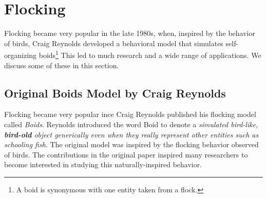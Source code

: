 





\section{Flocking}
Flocking became very popular in the late 1980s, when, inspired by the behavior of birds, Craig Reynolds developed a behavioral model that simulates self-organizing boids\footnote{A boid is synonymous with one entity taken from a flock.} This led to much research and a wide range of applications. We discuss some of these in this section.   

\subsection{Original Boids Model by Craig Reynolds}
Flocking became very popular ince Craig Reynolds published his flocking model called \textit{Boids}\cite{craig1}. Reynolds introduced the word Boid to denote a \textit{simulated bird-like, \textbf{bird-old} object generically even when they really represent other entities such as schooling fish}.  The original model was inspired by the flocking behavior observed of birds. The contributions in the original paper inspired  many researchers to become interested in studying this naturally-inspired behavior.

